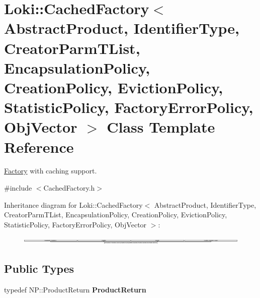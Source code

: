 \hypertarget{classLoki_1_1CachedFactory}{}\section{Loki\+:\+:Cached\+Factory$<$ Abstract\+Product, Identifier\+Type, Creator\+Parm\+T\+List, Encapsulation\+Policy, Creation\+Policy, Eviction\+Policy, Statistic\+Policy, Factory\+Error\+Policy, Obj\+Vector $>$ Class Template Reference}
\label{classLoki_1_1CachedFactory}


\hyperlink{classLoki_1_1Factory}{Factory} with caching support.  




{\ttfamily \#include $<$Cached\+Factory.\+h$>$}

Inheritance diagram for Loki\+:\+:Cached\+Factory$<$ Abstract\+Product, Identifier\+Type, Creator\+Parm\+T\+List, Encapsulation\+Policy, Creation\+Policy, Eviction\+Policy, Statistic\+Policy, Factory\+Error\+Policy, Obj\+Vector $>$\+:\begin{figure}[H]
\begin{center}
\leavevmode
\includegraphics[height=0.274241cm]{classLoki_1_1CachedFactory}
\end{center}
\end{figure}
\subsection*{Public Types}
\begin{DoxyCompactItemize}
\item 
\hypertarget{classLoki_1_1CachedFactory_a2067d0fdbe613d4d581d6c38fa26f7f0}{}typedef N\+P\+::\+Product\+Return {\bfseries Product\+Return}\label{classLoki_1_1CachedFactory_a2067d0fdbe613d4d581d6c38fa26f7f0}

\end{DoxyCompactItemize}
